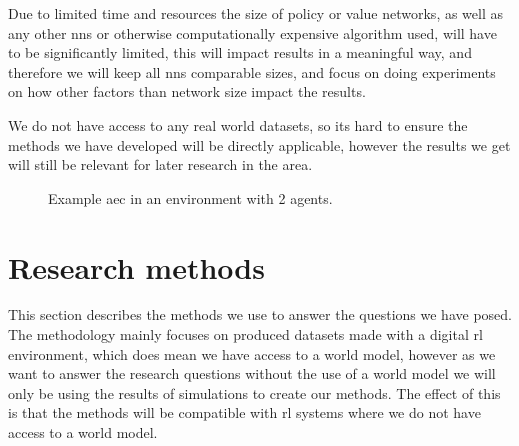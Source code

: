 \documentclass[UKenglish]{uiomasterthesis}
\begin{document}
Due to limited time and resources the size of policy or value networks, as well as any other \acp{nn} or otherwise computationally expensive algorithm used, will have to be significantly limited, this will impact results in a meaningful way, and therefore we will keep all \acp{nn} comparable sizes, and focus on doing experiments on how other factors than network size impact the results.

We do not have access to any real world datasets, so its hard to ensure the methods we have developed will be directly applicable, however the results we get will still be relevant for later research in the area.
\begin{figure}[H]
\centering
{}

\caption{Example \ac{aec} in an environment with 2 agents.}
\label{fig:aec}
\end{figure}

\section{Research methods}
\label{sec:research}
This section describes the methods we use to answer the questions we have posed. The methodology mainly focuses on produced datasets made with a digital \ac{rl} environment, which does mean we have access to a world model, however as we want to answer the research questions without the use of a world model we will only be using the results of simulations to create our methods. The effect of this is that the methods will be compatible with \ac{rl} systems where we do not have access to a world model.
\end{document}
